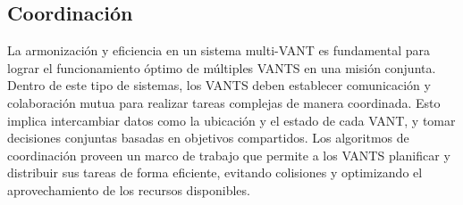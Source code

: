 \documentclass[sigconf]{acmart}
\providecommand{\DIFadd}[1]{{\protect\color{blue}\uwave{#1}}} %
\providecommand{\DIFaddbegin}{} %
\providecommand{\DIFaddend}{} %
\begin{document}
\subsection*{\DIFaddbegin \DIFadd{Comunicación - }\DIFaddend Coordinación}

La armonización y eficiencia en un sistema multi-VANT es fundamental para lograr el funcionamiento óptimo de múltiples VANTS en una misión conjunta. Dentro de este tipo de sistemas, los VANTS deben establecer comunicación y colaboración mutua para realizar tareas complejas de manera coordinada. Esto implica intercambiar datos como la ubicación y el estado de cada VANT, y tomar decisiones conjuntas basadas en objetivos compartidos. Los algoritmos de coordinación proveen un marco de trabajo que permite a los VANTS planificar y distribuir sus tareas de forma eficiente, evitando colisiones y optimizando el aprovechamiento de los recursos disponibles. %
\end{document}

